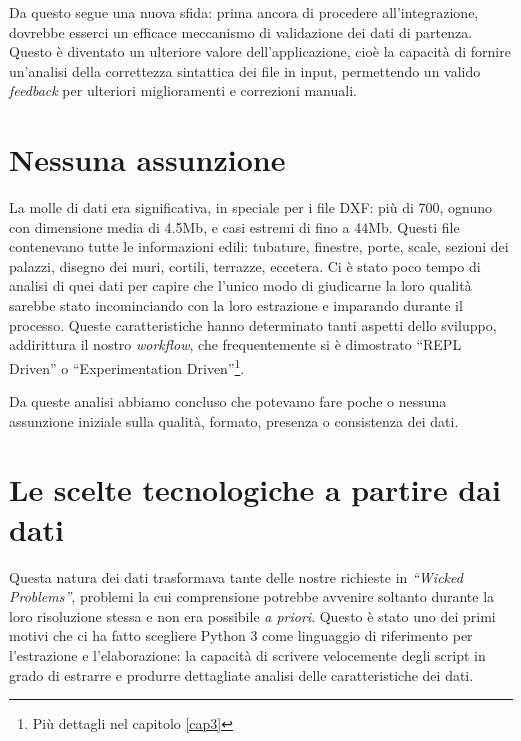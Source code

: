\documentclass[12pt]{report}
\begin{document}
Da questo segue una nuova sfida: prima ancora di procedere all'integrazione, dovrebbe esserci un efficace meccanismo di validazione dei dati di partenza. Questo è diventato un ulteriore valore dell'applicazione, cioè la capacità di fornire un'analisi della correttezza sintattica dei file in input, permettendo un valido \textit{feedback} per ulteriori miglioramenti e correzioni manuali.

\section*{Nessuna assunzione}

La molle di dati era significativa, in speciale per i file DXF: più di 700, ognuno con dimensione media di 4.5Mb, e casi estremi di fino a 44Mb. Questi file contenevano tutte le informazioni edili: tubature, finestre, porte, scale, sezioni dei palazzi, disegno dei muri, cortili, terrazze, eccetera. Ci è stato poco tempo di analisi di quei dati per capire che l'unico modo di giudicarne la loro qualità sarebbe stato incominciando con la loro estrazione e imparando durante il processo. Queste caratteristiche hanno determinato tanti aspetti dello sviluppo, addirittura il nostro \textit{workflow}, che frequentemente si è dimostrato ``REPL Driven'' o ``Experimentation Driven''\footnote{Più dettagli nel capitolo \ref{cap3}}. 

Da queste analisi abbiamo concluso che potevamo fare poche o nessuna assunzione iniziale sulla qualità, formato, presenza o consistenza dei dati.

\section{Le scelte tecnologiche a partire dai dati}

Questa natura dei dati trasformava tante delle nostre richieste in \textit{``Wicked Problems''}, problemi la cui comprensione potrebbe avvenire soltanto durante la loro risoluzione stessa e non era possibile \textit{a priori}. Questo è stato uno dei primi motivi che ci ha fatto scegliere Python 3 come linguaggio di riferimento per l'estrazione e l'elaborazione: la capacità di scrivere velocemente degli script in grado di estrarre e produrre dettagliate analisi delle caratteristiche dei dati. 
\end{document}
